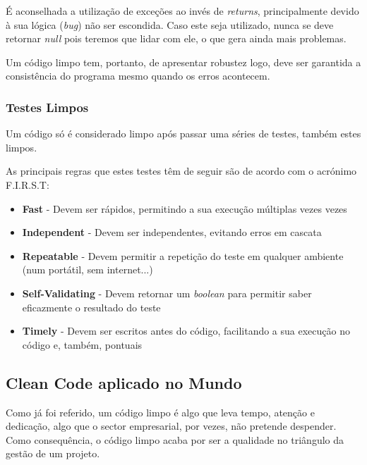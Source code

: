 \documentclass[10pt,portuguese]{article}
\begin{document}
\Par É aconselhada a utilização de exceções ao invés de \textit{returns}, principalmente devido à sua lógica (\textit{bug}) não ser escondida. Caso este seja utilizado, nunca se deve retornar \textit{null} pois teremos que lidar com ele, o que gera ainda mais problemas. 

\par Um código limpo tem, portanto, de apresentar robustez logo, deve ser garantida a consistência do programa mesmo quando os erros acontecem.

\subsubsection{Testes Limpos}

\Par Um código só é considerado limpo após passar uma séries de testes, também estes limpos.

\Par As principais regras que estes testes têm de seguir são de acordo com o acrónimo F.I.R.S.T:

\begin{itemize}
    \item \textbf{Fast} - Devem ser rápidos, permitindo a sua execução múltiplas vezes vezes
    \item \textbf{Independent} - Devem ser independentes, evitando erros em cascata
    \item \textbf{Repeatable} - Devem permitir a repetição do teste em qualquer ambiente (num portátil, sem internet...)
    \item \textbf{Self-Validating} - Devem retornar um \textit{boolean} para permitir saber eficazmente o resultado do teste
    \item \textbf{Timely} - Devem ser escritos antes do código, facilitando a sua execução no código e, também, pontuais
\end{itemize}

\clearpage

\subsection{Clean Code aplicado no Mundo}

\Par Como já foi referido, um código limpo é algo que leva tempo, atenção e dedicação, algo que o sector empresarial, por vezes, não pretende despender. Como consequência, o código limpo acaba por ser a qualidade no triângulo da gestão de um projeto.
\end{document}
